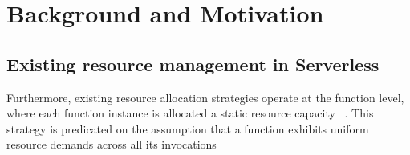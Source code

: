 \section{Background and Motivation}
\label{sec:background}

\subsection{Existing resource management in Serverless}
\label{sec:background:resource-management}






Furthermore, existing resource allocation strategies operate at the function level, where each function instance is allocated a static resource capacity~\cite{Doc:AWS_Lambda_Mem, Doc:Azure_Functions_Hosting, Doc:GCP_CloudRun_Mem, ASPLOS21:FaasCache} . This strategy is predicated on the assumption that a function exhibits uniform resource demands across all its invocations


